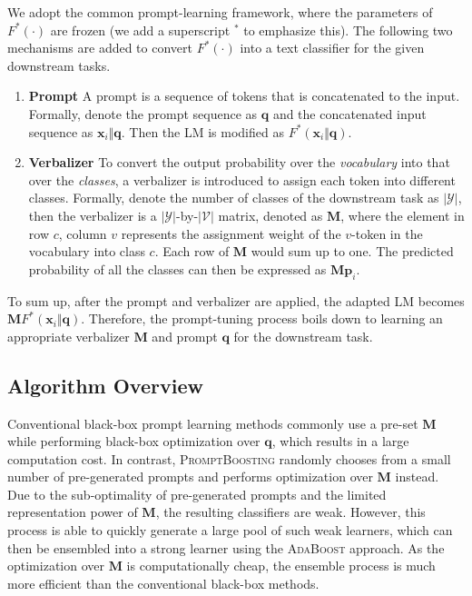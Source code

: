 \documentclass{article}
\theoremstyle{plain}
\theoremstyle{definition}
\theoremstyle{remark}
\newcommand{\alg}{\textsc{PromptBoosting}}
\begin{document}
We adopt the common prompt-learning framework, where the parameters of $F^*(\cdot)$ are frozen (we add a superscript $^*$ to emphasize this). The following two mechanisms are added to convert $F^*(\cdot)$ into a text classifier for the given downstream tasks.
\vspace*{-2mm}
\begin{enumerate}[leftmargin=*]
    \item \textbf{Prompt} \quad A prompt is a sequence of tokens that is concatenated to the input. Formally, denote the prompt sequence as $\bm q$ and the concatenated input sequence as $\bm x_i \Vert \bm q$. Then the LM is modified as $F^*(\bm x_i \Vert \bm q)$.
\vspace*{-1mm}
    \item \textbf{Verbalizer} \quad To convert the output probability over the \emph{vocabulary} into that over the \emph{classes}, a verbalizer is introduced to assign each token into different classes. Formally, denote the number of classes of the downstream task as $|\mathcal{Y}|$, then the verbalizer is a $|\mathcal{Y}|$-by-$|\mathcal{V}|$ matrix, denoted as $\bm M$, where the element in row $c$, column $v$ represents the assignment weight of the $v$-token in the vocabulary into class $c$. Each row of $\bm M$ would sum up to one. The predicted probability of all the classes can then be expressed as $\bm M \bm p_i$.
\end{enumerate}
\vspace*{-2mm}

To sum up, after the prompt and verbalizer are applied, the adapted LM becomes $\bm M F^*(\bm x_i \Vert \bm q)$. Therefore, the prompt-tuning process boils down to learning an appropriate verbalizer $\bm M$ and prompt $\bm q$ for the downstream task. 

\subsection{Algorithm Overview}
\label{subsec:overview}

Conventional black-box prompt learning methods commonly use a pre-set $\bm M$ while performing black-box optimization over $\bm q$, which results in a large computation cost. In contrast, {\alg} randomly chooses from a small number of pre-generated prompts and performs optimization over $\bm M$ instead. Due to the sub-optimality of pre-generated prompts and the limited representation power of $\bm M$, the resulting classifiers are weak. However, this process is able to quickly generate a large pool of such weak learners, which can then be ensembled into a strong learner using the \textsc{AdaBoost} approach. As the optimization over $\bm M$ is computationally cheap, the ensemble process is much more efficient than the conventional black-box methods.
\end{document}
